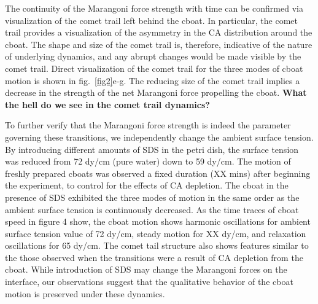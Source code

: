 \documentclass[journal=langd5, manuscript=article, layout=twocolumn]{achemso}
\begin{document}
The continuity of the Marangoni force strength with time can be confirmed via visualization of the comet trail left behind the cboat. In particular, the comet trail provides a visualization of the asymmetry in the CA distribution around the cboat. The shape and size of the comet trail is, therefore, indicative of the nature of underlying dynamics, and any abrupt changes would be made visible by the comet trail. Direct visualization of the comet trail for the three modes of cboat motion is shown in fig.~\ref{fig2}e-g. The reducing size of the comet trail implies a decrease in the strength of the net Marangoni force propelling the cboat. {\bf What the hell do we see in the comet trail dynamics?}

To further verify that the Marangoni force strength is indeed the parameter governing these transitions, we independently change the ambient surface tension. By introducing different amounts of SDS in the petri dish, the surface tension was reduced from 72 dy/cm (pure water) down to 59 dy/cm. The motion of  freshly prepared cboats was observed a fixed duration (XX mins) after beginning the experiment, to control for the effects of CA depletion. The cboat in the presence of SDS exhibited the three modes of motion in the same order as the ambient surface tension is continuously decreased. As the time traces of cboat speed in figure 4 show, the cboat motion shows harmonic oscillations for ambient surface tension value of 72 dy/cm, steady motion for XX dy/cm, and relaxation oscillations for 65 dy/cm. The comet tail structure also shows features similar to the those observed when the transitions were a result of CA depletion from the cboat. While introduction of SDS may change the Marangoni forces on the interface, our observations suggest that the qualitative behavior of the cboat motion is preserved under these dynamics.
\end{document}
